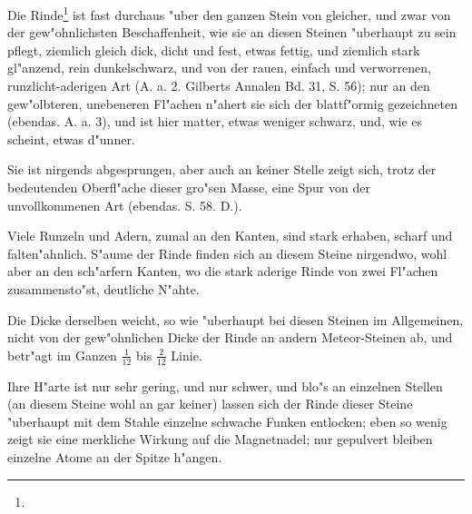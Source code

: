 \documentclass[a4paper, 11pt, oneside, german]{article}
\begin{document}
Die Rinde\footnote{} ist fast durchaus "uber den ganzen Stein von gleicher, und zwar von der gew"ohnlichsten Beschaffenheit, wie sie an diesen Steinen "uberhaupt zu sein pflegt, ziemlich gleich dick, dicht und fest, etwas fettig, und ziemlich stark gl"anzend, rein dunkelschwarz, und von der rauen, einfach und verworrenen, runzlicht-aderigen Art (A. a. 2. Gilberts Annalen Bd. 31, S. 56); nur an den gew"olbteren, unebeneren Fl"achen n"ahert sie sich der blattf"ormig gezeichneten (ebendas. A. a. 3), und ist hier matter, etwas weniger schwarz, und, wie es scheint, etwas d"unner.

Sie ist nirgends abgesprungen, aber auch an keiner Stelle zeigt sich, trotz der bedeutenden Oberfl"ache dieser gro"sen Masse, eine Spur von der unvollkommenen Art (ebendas. S. 58. D.).

Viele Runzeln und Adern, zumal an den Kanten, sind stark erhaben, scharf und falten"ahnlich. S"aume der Rinde finden sich an diesem Steine nirgendwo, wohl aber an den sch"arfern Kanten, wo die stark aderige Rinde von zwei Fl"achen zusammensto"st, deutliche N"ahte.

Die Dicke derselben weicht, so wie "uberhaupt bei diesen Steinen im Allgemeinen, nicht von der gew"ohnlichen Dicke der Rinde an andern Meteor-Steinen ab, und betr"agt im Ganzen $\frac{1}{12}$ bis $\frac{2}{12}$ Linie.

Ihre H"arte ist nur sehr gering, und nur schwer, und blo"s an einzelnen Stellen (an diesem Steine wohl an gar keiner) lassen sich der Rinde dieser Steine "uberhaupt mit dem Stahle einzelne schwache Funken entlocken; eben so wenig zeigt sie eine merkliche Wirkung auf die Magnetnadel; nur gepulvert bleiben einzelne Atome an der Spitze h"angen.
\end{document}
